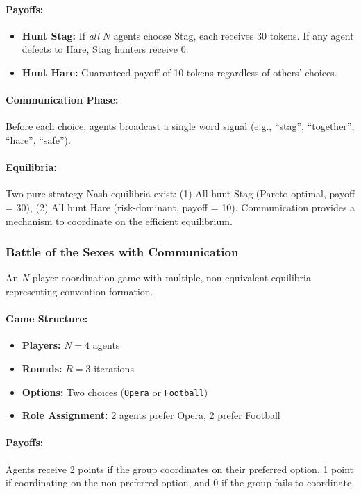 \paragraph{Payoffs:}
\begin{itemize}
    \item \textbf{Hunt Stag:} If \emph{all} $N$ agents choose Stag, each receives 30 tokens. If any agent defects to Hare, Stag hunters receive 0.
    \item \textbf{Hunt Hare:} Guaranteed payoff of 10 tokens regardless of others' choices.
\end{itemize}

\paragraph{Communication Phase:}
Before each choice, agents broadcast a single word signal (e.g., ``stag'', ``together'', ``hare'', ``safe'').

\paragraph{Equilibria:}
Two pure-strategy Nash equilibria exist: (1) All hunt Stag (Pareto-optimal, payoff = 30), (2) All hunt Hare (risk-dominant, payoff = 10). Communication provides a mechanism to coordinate on the efficient equilibrium.

\subsubsection{Battle of the Sexes with Communication}

An $N$-player coordination game with multiple, non-equivalent equilibria representing convention formation.

\paragraph{Game Structure:}
\begin{itemize}
    \item \textbf{Players:} $N = 4$ agents
    \item \textbf{Rounds:} $R = 3$ iterations
    \item \textbf{Options:} Two choices (\texttt{Opera} or \texttt{Football})
    \item \textbf{Role Assignment:} 2 agents prefer Opera, 2 prefer Football
\end{itemize}

\paragraph{Payoffs:}
Agents receive 2 points if the group coordinates on their preferred option, 1 point if coordinating on the non-preferred option, and 0 if the group fails to coordinate.

